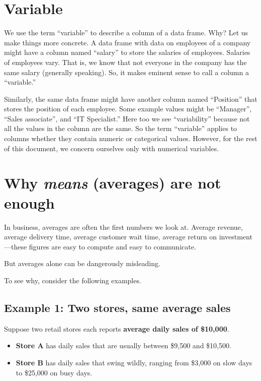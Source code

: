 \documentclass[
  12pt,
  letterpaper,
  DIV=11,
  numbers=noendperiod]{scrreprt}
\providecommand{\tightlist}{%
  \setlength{\itemsep}{0pt}\setlength{\parskip}{0pt}}
\begin{document}
\section{Variable}\label{variable}

We use the term ``variable'' to describe a column of a data frame. Why?
Let us make things more concrete. A data frame with data on employees of
a company might have a column named ``salary'' to store the salaries of
employees. Salaries of employees vary. That is, we know that not
everyone in the company has the same salary (generally speaking). So, it
makes eminent sense to call a column a ``variable.''

Similarly, the same data frame might have another column named
``Position'' that stores the position of each employee. Some example
values might be ``Manager'', ``Sales associate'', and ``IT Specialist.''
Here too we see ``variability'' because not all the values in the column
are the same. So the term ``variable'' applies to columns whether they
contain numeric or categorical values. However, for the rest of this
document, we concern ourselves only with numerical variables.

\section{\texorpdfstring{Why \emph{means} (averages) are not
enough}{Why means (averages) are not enough}}\label{why-means-averages-are-not-enough}

In business, averages are often the first numbers we look at. Average
revenue, average delivery time, average customer wait time, average
return on investment---these figures are easy to compute and easy to
communicate.

But averages alone can be dangerously misleading.

To see why, consider the following examples.

\subsection{Example 1: Two stores, same average
sales}\label{example-1-two-stores-same-average-sales}

Suppose two retail stores each reports \textbf{average daily sales of
\$10,000}.

\begin{itemize}
\tightlist
\item
  \textbf{Store A} has daily sales that are usually between \$9,500 and
  \$10,500.
\item
  \textbf{Store B} has daily sales that swing wildly, ranging from
  \$3,000 on slow days to \$25,000 on busy days.
\end{itemize}
\end{document}

